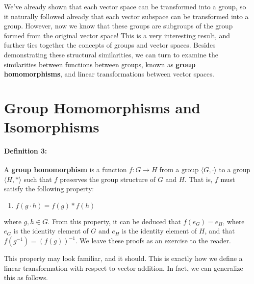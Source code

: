 \documentclass[twoside]{article}
\begin{document}
We've already shown that each vector space can be transformed into a group,
so it naturally followed already that each vector subspace can be transformed
into a group. However, now we know that these groups are subgroups of the
group formed from the original vector space! This is a very interesting result,
and further ties together the concepts of groups and vector spaces. Besides 
demonstrating these structural similarities, we can turn to examine the similarities between
functions between groups, known as \textbf{group homomorphisms}, 
and linear transformations between vector spaces.

\section{Group Homomorphisms and Isomorphisms} 

\paragraph{Definition 3:} A \textbf{group homomorphism} is a function $f:G\rightarrow H$ from a group 
$\langle G, \cdot\rangle$ to a group $\langle H, *\rangle$ such that 
$f$ preserves the group structure of $G$ and $H$. That is, $f$ must satisfy the following
property:
\begin{enumerate}
    \item $f(g\cdot h) = f(g) * f(h)$
\end{enumerate}
where $g,h\in G$.
From this property, it can be deduced that $f(e_G) = e_H$, where $e_G$ is the
identity element of $G$ and $e_H$ is the identity element of $H$, and that 
$f(g^{-1}) = (f(g))^{-1}$. We leave these proofs as an exercise to the reader.

This property may look familiar, and it should. This is exactly how we define a linear 
transformation with respect to vector addition. In fact, we can generalize this 
as follows. 
\end{document}

